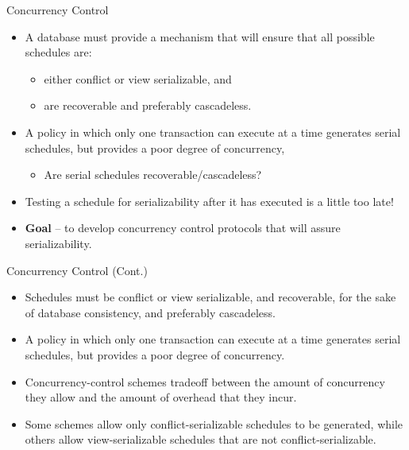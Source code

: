 \documentclass[aspectratio=169]{beamer}
\begin{document}
\begin{frame}{Concurrency Control}

    \begin{itemize}
        \item A database must provide a mechanism that will ensure that all possible schedules are:
            \begin{itemize}
                \item either conflict or view serializable, and
                \item are recoverable and preferably cascadeless.
            \end{itemize}
        \item A policy in which only one transaction can execute at a time generates serial schedules, but provides a poor degree of concurrency,
            \begin{itemize}
                \item Are serial schedules recoverable/cascadeless?
            \end{itemize}
        \item Testing a schedule for serializability after it has executed is a little too late!
        \item \textbf{Goal} – to develop concurrency control protocols that will assure serializability.
    \end{itemize}

\end{frame}

\begin{frame}{Concurrency Control (Cont.)}

    \begin{itemize}
        \item Schedules must be conflict or view serializable, and recoverable, for the sake of database consistency, and preferably cascadeless.
        \item A policy in which only one transaction can execute at a time generates serial schedules, but provides a poor degree of concurrency.
        \item Concurrency-control schemes tradeoff between the amount of concurrency they allow and the amount of overhead that they incur.
        \item Some schemes allow only conflict-serializable schedules to be generated, while others allow view-serializable schedules that are not conflict-serializable.
    \end{itemize}

\end{frame}
\end{document}
